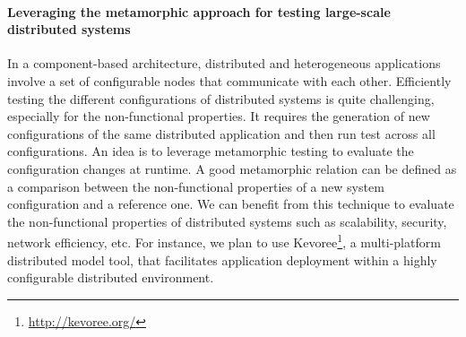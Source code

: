 \paragraph{Leveraging the metamorphic approach for testing large-scale distributed systems}
In a component-based architecture, distributed and heterogeneous applications involve a set of configurable nodes that communicate with each other. Efficiently testing the different configurations of distributed systems is quite challenging, especially for the non-functional properties. It requires the generation of new configurations of the same distributed application and then run test across all configurations. An idea is to leverage metamorphic testing to evaluate the configuration changes at runtime. 
A good metamorphic relation can be defined as a comparison between the non-functional properties of a new system configuration and a reference one.
We can benefit from this technique to evaluate the non-functional properties of distributed systems such as scalability, security, network efficiency, etc. For instance, we plan to use Kevoree\footnote{\url{http://kevoree.org/}}, a multi-platform distributed model tool, that facilitates application deployment within a highly configurable distributed environment.
